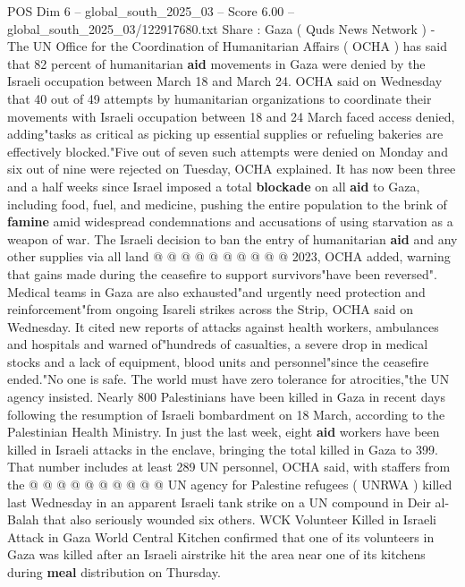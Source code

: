 \begin{textsample}{POS Dim 6 – global\_south\_2025\_03 – Score 6.00 – global\_south\_2025\_03/122917680.txt}  \label{ex:f6_pos_222}
Share : Gaza ( Quds News Network ) - The UN Office for the Coordination of Humanitarian Affairs ( OCHA ) has said that 82 percent of humanitarian \textbf{aid} movements in Gaza were denied by the Israeli occupation between March 18 and March 24.
OCHA said on Wednesday that 40 out of 49 attempts by humanitarian organizations to coordinate their movements with Israeli occupation between 18 and 24 March faced access denied, adding"tasks as critical as picking up essential supplies or refueling bakeries are effectively blocked."Five out of seven such attempts were denied on Monday and six out of nine were rejected on Tuesday, OCHA explained.
It has now been three and a half weeks since Israel imposed a total \textbf{blockade} on all \textbf{aid} to Gaza, including food, fuel, and medicine, pushing the entire population to the brink of \textbf{famine} amid widespread condemnations and accusations of using starvation as a weapon of war.
The Israeli decision to ban the entry of humanitarian \textbf{aid} and any other supplies via all land @ @ @ @ @ @ @ @ @ @ 2023, OCHA added, warning that gains made during the ceasefire to support survivors"have been reversed".
Medical teams in Gaza are also exhausted"and urgently need protection and reinforcement"from ongoing Isareli strikes across the Strip, OCHA said on Wednesday.
It cited new reports of attacks against health workers, ambulances and hospitals and warned of"hundreds of casualties, a severe drop in medical stocks and a lack of equipment, blood units and personnel"since the ceasefire ended."No one is safe.
The world must have zero tolerance for atrocities,"the UN agency insisted.
Nearly 800 Palestinians have been killed in Gaza in recent days following the resumption of Israeli bombardment on 18 March, according to the Palestinian Health Ministry.
In just the last week, eight \textbf{aid} workers have been killed in Israeli attacks in the enclave, bringing the total killed in Gaza to 399.
That number includes at least 289 UN personnel, OCHA said, with staffers from the @ @ @ @ @ @ @ @ @ @ UN agency for Palestine refugees ( UNRWA ) killed last Wednesday in an apparent Israeli tank strike on a UN compound in Deir al-Balah that also seriously wounded six others.
WCK Volunteer Killed in Israeli Attack in Gaza World Central Kitchen confirmed that one of its volunteers in Gaza was killed after an Israeli airstrike hit the area near one of its kitchens during \textbf{meal} distribution on Thursday.

\end{textsample}
